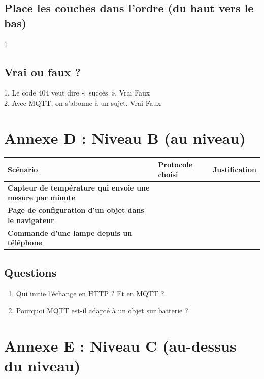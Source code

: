 \documentclass[11pt,a4paper]{article}
\begin{document}
\subsection*{Place les couches dans l'ordre (du haut vers le bas)}
1 \dotfill{} \dotfill{} \dotfill{} \dotfill

\subsection*{Vrai ou faux ?}
1. Le code 404 veut dire «~succès~». \cb Vrai \cb Faux\\
2. Avec MQTT, on s'abonne à un sujet. \cb Vrai \cb Faux

\newpage
\section*{Annexe D : Niveau B (au niveau)}

\begin{tabularx}{\linewidth}{>{\bfseries}p{4.2cm}Y Y}
\toprule
Scénario & Protocole choisi & Justification\\
\midrule
Capteur de température qui envoie une mesure par minute & & \\
Page de configuration d'un objet dans le navigateur & & \\
Commande d'une lampe depuis un téléphone & & \\
\bottomrule
\end{tabularx}

\subsection*{Questions}
\begin{enumerate}
 \item Qui initie l'échange en HTTP ? Et en MQTT ? \dotfill
 \item Pourquoi MQTT est-il adapté à un objet sur batterie ? \dotfill
\end{enumerate}

\newpage
\section*{Annexe E : Niveau C (au-dessus du niveau)}
\end{document}
